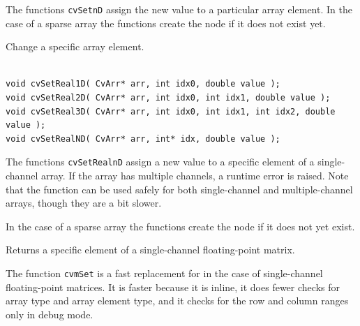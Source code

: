 The functions \texttt{cvSetnD} assign the new value to a particular array element. In the case of a sparse array the functions create the node if it does not exist yet.

\label{SetRealnD}

Change a specific array element.

\begin{lstlisting}

void cvSetReal1D( CvArr* arr, int idx0, double value );
void cvSetReal2D( CvArr* arr, int idx0, int idx1, double value );
void cvSetReal3D( CvArr* arr, int idx0, int idx1, int idx2, double value );
void cvSetRealND( CvArr* arr, int* idx, double value );

\end{lstlisting}

\begin{description}
\end{description}

The functions \texttt{cvSetRealnD} assign a new value to a specific
element of a single-channel array. If the array has multiple channels,
a runtime error is raised. Note that the  function can be used
safely for both single-channel and multiple-channel arrays, though they
are a bit slower.

In the case of a sparse array the functions create the node if it does not yet exist.

\label{mSet}

Returns a specific element of a single-channel floating-point matrix.


\begin{description}
\end{description}


The function \texttt{cvmSet} is a fast replacement for 
in the case of single-channel floating-point matrices. It is faster because
it is inline, it does fewer checks for array type and array element type, 
and it checks for the row and column ranges only in debug mode.

